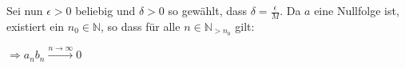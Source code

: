\documentclass{scrreprt}
\begin{document}
\begin{enumerate}[(a)]
  Sei nun $\epsilon > 0$ beliebig und $\delta > 0$ so gewählt, dass
  $\delta = \frac{\epsilon}{M}$.
  Da $a$ eine Nullfolge ist, existiert ein $n_0 \in \mathbb{N}$, so dass
  für alle $n \in \mathbb{N}_{> n_0}$ gilt:

  $\Rightarrow a_nb_n \overset{n \to \infty}\longrightarrow 0$
\end{enumerate}
\end{document}
